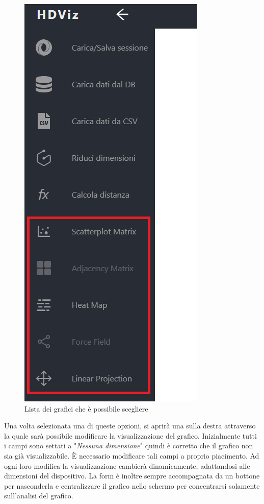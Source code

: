\begin{figure}[H]
		\includegraphics[scale=0.6]{Images/OptionList.png}
		\centering
		\caption{Lista dei grafici che è possibile scegliere}
\end{figure}
Una volta selezionata una di queste opzioni, si aprirà una  sulla destra attraverso la quale sarà possibile modificare la visualizzazione del grafico. Inizialmente tutti i campi sono settati a "\textit{Nessuna dimensione}" quindi è corretto che il grafico non sia già visualizzabile. È necessario modificare tali campi a proprio piacimento. Ad ogni loro modifica la visualizzazione cambierà dinamicamente, adattandosi alle dimensioni del dispositivo. La form è inoltre sempre accompagnata da un bottone per nasconderla e centralizzare il grafico nello schermo per concentrarsi solamente sull'analisi del grafico. 

